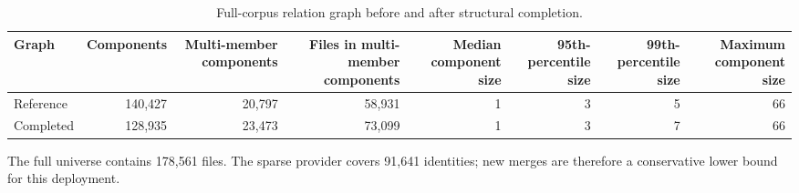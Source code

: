\begin{table}[t]
\caption{Full-corpus relation graph before and after structural completion.}
\label{tab:lmd-graph-completion}
\centering
\scriptsize
\begin{tabular}{lrrrrrrr}
\toprule
Graph & Components & Multi-member components & Files in multi-member components & Median component size & 95th-percentile size & 99th-percentile size & Maximum component size \\
\midrule
Reference & 140,427 & 20,797 & 58,931 & 1 & 3 & 5 & 66 \\
Completed & 128,935 & 23,473 & 73,099 & 1 & 3 & 7 & 66 \\
\bottomrule
\end{tabular}
\vspace{2pt}
\begin{minipage}{\textwidth}
\footnotesize The full universe contains 178,561 files. The sparse provider covers 91,641 identities; new merges are therefore a conservative lower bound for this deployment.
\end{minipage}
\end{table}

